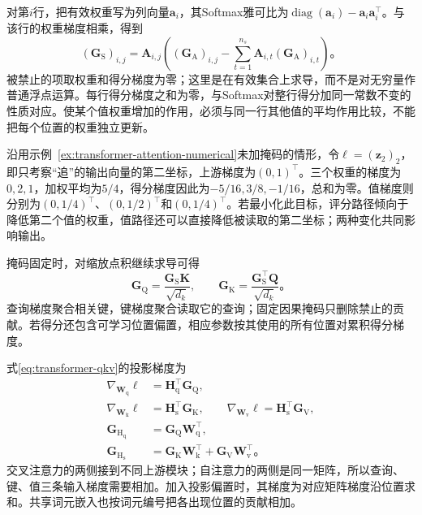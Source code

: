 对第$i$行，把有效权重写为列向量$\bm a_i$，其Softmax雅可比为$\operatorname{diag}(\bm a_i)-\bm a_i\bm a_i^{\top}$。与该行的权重梯度相乘，得到
\begin{equation}
  (\bm G_{\mathrm S})_{i,j}
   =\bm A_{i,j}\left((\bm G_{\mathrm A})_{i,j}
       -\sum_{t=1}^{n_s}\bm A_{i,t}(\bm G_{\mathrm A})_{i,t}\right)\text{。}
  \label{eq:transformer-softmax-gradient}
\end{equation}
被禁止的项取权重和得分梯度为零；这里是在有效集合上求导，而不是对无穷量作普通浮点运算。每行得分梯度之和为零，与Softmax对整行得分加同一常数不变的性质对应。使某个值权重增加的作用，必须与同一行其他值的平均作用比较，不能把每个位置的权重独立更新。

\Needspace{45mm}
\begin{example}[从聚合误差到评分误差]
  \label{ex:transformer-gradient-numerical}
  沿用示例~\ref{ex:transformer-attention-numerical}未加掩码的情形，令$\ell=(\bm z_2)_2$，即只考察“追”的输出向量的第二坐标，上游梯度为$(0,1)^{\top}$。三个权重的梯度为$0,2,1$，加权平均为$5/4$，得分梯度因此为$-5/16,3/8,-1/16$，总和为零。值梯度则分别为$(0,1/4)^{\top}$、$(0,1/2)^{\top}$和$(0,1/4)^{\top}$。若最小化此目标，评分路径倾向于降低第二个值的权重，值路径还可以直接降低被读取的第二坐标；两种变化共同影响输出。
\end{example}

掩码固定时，对缩放点积继续求导可得
\begin{equation}
  \bm G_{\mathrm Q}=\frac{\bm G_{\mathrm S}\bm K}{\sqrt{d_k}},\qquad
  \bm G_{\mathrm K}=\frac{\bm G_{\mathrm S}^{\top}\bm Q}{\sqrt{d_k}}\text{。}
  \label{eq:transformer-qk-gradient}
\end{equation}
查询梯度聚合相关键，键梯度聚合读取它的查询；固定因果掩码只删除禁止的贡献。若得分还包含可学习位置偏置，相应参数按其使用的所有位置对累积得分梯度。

式\eqref{eq:transformer-qkv}的投影梯度为
\begin{equation}
  \begin{aligned}
    \nabla_{\bm W_{\mathrm q}}\ell&=\bm H_{\mathrm q}^{\top}\bm G_{\mathrm Q},\\
    \nabla_{\bm W_{\mathrm k}}\ell&=\bm H_{\mathrm s}^{\top}\bm G_{\mathrm K},\qquad
    \nabla_{\bm W_{\mathrm v}}\ell=\bm H_{\mathrm s}^{\top}\bm G_{\mathrm V},\\
    \bm G_{\mathrm H_{\mathrm q}}&=\bm G_{\mathrm Q}\bm W_{\mathrm q}^{\top},\\
    \bm G_{\mathrm H_{\mathrm s}}&=\bm G_{\mathrm K}\bm W_{\mathrm k}^{\top}
                      +\bm G_{\mathrm V}\bm W_{\mathrm v}^{\top}\text{。}
  \end{aligned}
  \label{eq:transformer-projection-gradient}
\end{equation}
交叉注意力的两侧接到不同上游模块；自注意力的两侧是同一矩阵，所以查询、键、值三条输入梯度需要相加。加入投影偏置时，其梯度为对应矩阵梯度沿位置求和。共享词元嵌入也按词元编号把各出现位置的贡献相加。

